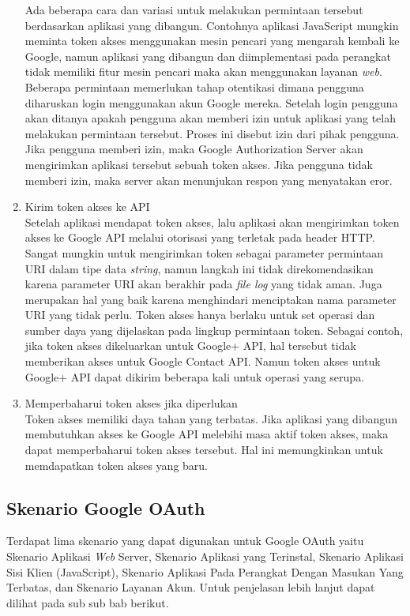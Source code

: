 \begin{enumerate}[(1)]
Ada beberapa cara dan variasi untuk melakukan permintaan tersebut berdasarkan
aplikasi yang dibangun. Contohnya aplikasi JavaScript mungkin meminta token
akses menggunakan mesin pencari yang mengarah kembali ke Google, namun aplikasi
yang dibangun dan diimplementasi pada perangkat tidak memiliki fitur mesin
pencari maka akan menggunakan layanan {\it web}. Beberapa permintaan memerlukan
tahap otentikasi dimana pengguna diharuskan login menggunakan akun Google mereka.
Setelah login pengguna akan ditanya apakah pengguna akan memberi izin untuk
aplikasi yang telah melakukan permintaan tersebut. Proses ini disebut izin dari
pihak pengguna. Jika pengguna memberi izin, maka Google Authorization Server
akan mengirimkan aplikasi tersebut sebuah token akses. Jika pengguna tidak
memberi izin, maka server akan menunjukan respon yang menyatakan eror.
\item
Kirim token akses ke API\\
Setelah aplikasi mendapat token akses, lalu aplikasi akan mengirimkan token
akses ke Google API melalui otorisasi yang terletak pada header HTTP. Sangat
mungkin untuk mengirimkan token sebagai parameter permintaan URI dalam tipe data
{\it string}, namun langkah ini tidak direkomendasikan karena parameter URI akan
berakhir pada {\it file log} yang tidak aman. Juga merupakan hal yang baik
karena menghindari menciptakan nama parameter URI yang tidak perlu. Token akses hanya
berlaku untuk set operasi dan sumber daya yang dijelaskan pada lingkup
permintaan token. Sebagai contoh, jika token akses dikeluarkan untuk Google+
API, hal tersebut tidak memberikan akses untuk Google Contact API. Namun token
akses untuk Google+ API dapat dikirim beberapa kali untuk operasi yang serupa.
\item
Memperbaharui token akses jika diperlukan\\
Token akses memiliki daya tahan yang terbatas. Jika aplikasi yang dibangun
membutuhkan akses ke Google API melebihi masa aktif token akses, maka dapat
memperbaharui token akses tersebut. Hal ini memungkinkan untuk memdapatkan token
akses yang baru.
\end{enumerate}

\subsection{Skenario Google OAuth}
Terdapat lima skenario yang dapat digunakan untuk Google OAuth yaitu
Skenario Aplikasi {\it Web} Server, Skenario Aplikasi yang Terinstal, Skenario
Aplikasi Sisi Klien (JavaScript), Skenario Aplikasi Pada Perangkat Dengan
Masukan Yang Terbatas, dan Skenario Layanan Akun. Untuk penjelasan lebih lanjut
dapat dilihat pada sub sub bab berikut.

